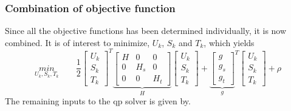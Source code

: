 \subsubsection*{Combination of objective function}
Since all the objective functions has been determined individually, it is now combined. It is of interest to minimize, $U_k$, $S_k$ and $T_k$, which yields
\begin{equation}
    \underset{U_k,S_k,T_k}{min}\qquad\frac{1}{2}\begin{bmatrix}
        U_k\\ S_k\\ T_k
    \end{bmatrix}^T
    \underbrace{\begin{bmatrix}
        H & 0 & 0\\
        0 & H_s & 0\\
        0 & 0 & H_t
    \end{bmatrix}}_H
    \begin{bmatrix}
        U_k\\ S_k\\ T_k
    \end{bmatrix}+
    {\underbrace{\begin{bmatrix}
        g\\ g_s\\ g_t
    \end{bmatrix}}_g}^T
    \begin{bmatrix}
        U_k\\ S_k\\ T_k
    \end{bmatrix} + \rho
\end{equation}
The remaining inputs to the qp solver is given by.
